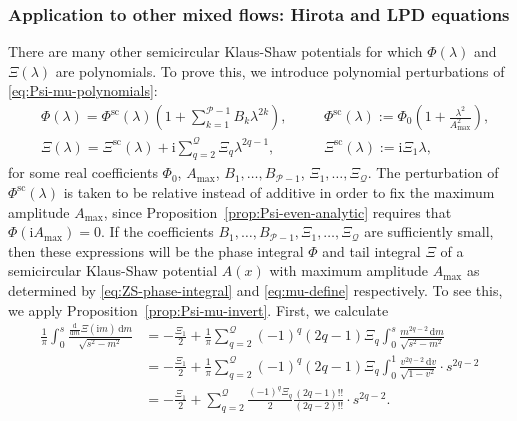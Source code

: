 \documentclass[12pt]{amsart}
\numberwithin{equation}{section}
\newcommand{\dd}{\mathrm{d}}
\newcommand{\ii}{\mathrm{i}}
\newcommand{\SP}{\lambda}
\newcommand{\phaseint}{\Phi}
\newcommand{\tailint}{\Xi}
\begin{document}
\subsubsection{Application to other mixed flows:  Hirota and LPD equations}
There are many other semicircular Klaus-Shaw potentials for which $\phaseint(\SP)$ and $\tailint(\SP)$ are polynomials.  To prove this, we introduce polynomial perturbations of \eqref{eq:Psi-mu-polynomials}:
\begin{equation}
\begin{aligned}
&\phaseint(\SP) = \phaseint^\mathrm{sc}(\SP)\left(1+\sum_{k=1}^{\mathcal{P}-1}B_k\SP^{2k}\right), \quad
&&\phaseint^\mathrm{sc}(\SP):= \phaseint_0 \left( 1+ \frac{\SP^2}{ A_\mathrm{max}^2} \right),\\ 
&\tailint(\SP) =\tailint^\mathrm{sc}(\SP)+\ii\sum_{q=2}^\mathcal{Q}\tailint_q\SP^{2q-1}, \quad
&&\tailint^\mathrm{sc}(\SP):= \ii \tailint_1 \SP,
\end{aligned}
\label{eq:phaseandtail-perturbations}
\end{equation}
for some real coefficients $\phaseint_0$, $A_\mathrm{max}$, $B_1,\dots,B_{\mathcal{P}-1}$, $\tailint_1,\dots,\tailint_{\mathcal{Q}}$.  The perturbation of $\phaseint^{\mathrm{sc}}(\SP)$ is taken to be relative instead of additive in order to fix the maximum amplitude $A_\mathrm{max}$, since Proposition~\ref{prop:Psi-even-analytic} requires that $\phaseint(\ii A_\mathrm{max})=0$. 
If the coefficients $B_1,\dots,B_{\mathcal{P}-1},\Xi_1,\dots,\Xi_\mathcal{Q}$ are sufficiently small, then these expressions will be the phase integral $\phaseint$ and tail integral $\tailint$ of a semicircular Klaus-Shaw potential $A(x)$ with maximum amplitude $A_\mathrm{max}$ as determined by 
\eqref{eq:ZS-phase-integral} and \eqref{eq:mu-define} respectively.  To see this, we apply Proposition~\ref{prop:Psi-mu-invert}.  
First, we calculate
\begin{equation}
\begin{split}
\frac{1}{\pi}\int_0^s\frac{\displaystyle\frac{\dd}{\dd m}\tailint(\ii m)\,\dd m}{\sqrt{s^2-m^2}}  
&= -\frac{\tailint_1}{2}+\frac{1}{\pi}\sum_{q=2}^\mathcal{Q}(-1)^q(2q-1)\tailint_q\int_0^s\frac{m^{2q-2}\,\dd m}{\sqrt{s^2-m^2}} \\
&=-\frac{\tailint_1}{2} +\frac{1}{\pi}\sum_{q=2}^\mathcal{Q}(-1)^q(2q-1)\tailint_q\int_0^1\frac{v^{2q-2}\,\dd v}{\sqrt{1-v^2}}\cdot s^{2q-2}\\
&=-\frac{\tailint_1}{2} +\sum_{q=2}^\mathcal{Q}\frac{(-1)^q\tailint_q}{2}\frac{(2q-1)!!}{(2q-2)!!}\cdot s^{2q-2}.
\end{split}
\end{equation}
\end{document}
